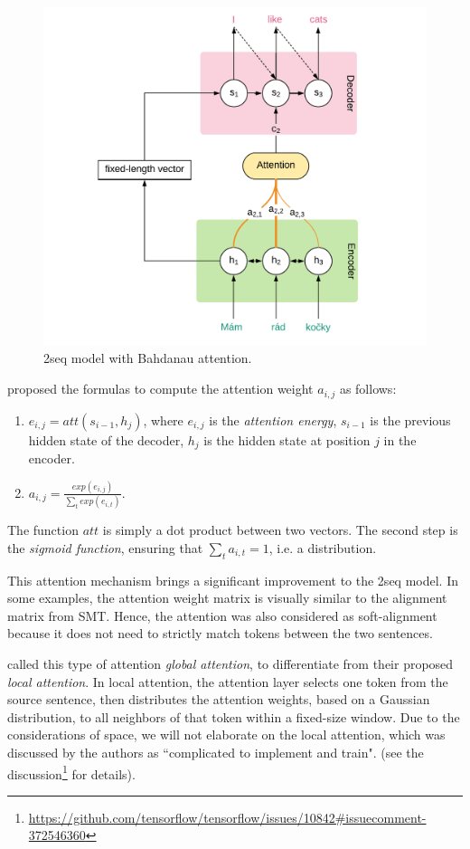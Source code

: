 \begin{figure}[t]
    \includegraphics[width=\linewidth]{img/seq2seq-att.pdf}
    \caption{\seq2seq model with Bahdanau attention.}
    \label{fig:seq2seq-att}
\end{figure}


\cite{bahdanau:etal:attention:iclr:2015} proposed the formulas to compute the attention weight $a_{i,j}$ as follows:
\begin{enumerate}
    \item $e_{i,j}=att(s_{i-1}, h_j)$, where $e_{i,j}$ is the \textit{attention energy}, $s_{i-1}$ is the previous hidden state of the decoder, $h_j$ is the hidden state at position $j$ in the encoder.
    \item $a_{i,j}=\frac{exp(e_{i,j})}{\sum_{t}exp(e_{i,t})}$.
\end{enumerate}

The function $att$ is simply a dot product between two vectors. The second step is the \textit{sigmoid function}, ensuring that $\sum_{t}a_{i,t} = 1$, i.e. a distribution. 

This attention mechanism brings a significant improvement to the \seq2seq model.
In some examples, the attention weight matrix is visually similar to the alignment matrix from SMT.
Hence, the attention was also considered as soft-alignment because it does not need to strictly match tokens between the two sentences.

\cite{DBLP:conf/emnlp/LuongPM15} called this type of attention \textit{global attention}, to differentiate from their proposed \textit{local attention}.
In local attention, the attention layer selects one token from the source sentence, then distributes the attention weights, based on a Gaussian distribution, to all neighbors of that token within a fixed-size window.
Due to the considerations of space, we will not elaborate on the local attention, which was discussed by the authors as ``complicated to implement and train".
(see the discussion\footnote{\url{https://github.com/tensorflow/tensorflow/issues/10842\#issuecomment-372546360}} for details).

